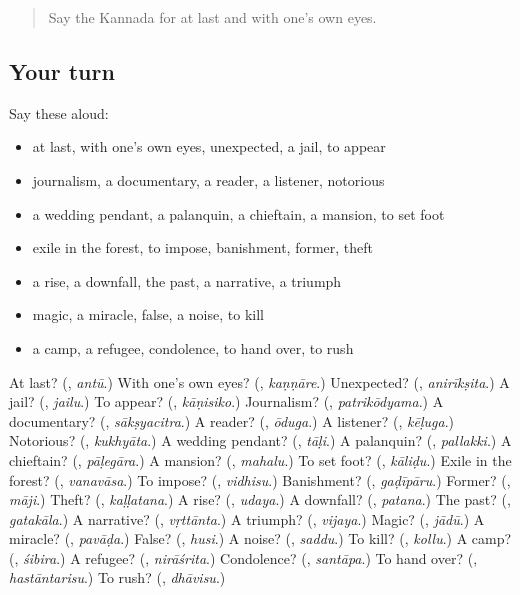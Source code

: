 \begin{quote}
Say the Kannada for at last and with one's own eyes.
\end{quote}

\subsection*{Your turn}
Say these aloud:

\begin{itemize}
\raggedright
  \item at last, with one's own eyes, unexpected, a jail, to appear
  \item journalism, a documentary, a reader, a listener, notorious
  \item a wedding pendant, a palanquin, a chieftain, a mansion, to set foot
  \item exile in the forest, to impose, banishment, former, theft
  \item a rise, a downfall, the past, a narrative, a triumph
  \item magic, a miracle, false, a noise, to kill
  \item a camp, a refugee, condolence, to hand over, to rush
\end{itemize}

\begin{tcolorbox}[breakable,colback=teal!4,colframe=teal!35!black,title={Before you move on}]
At last? (\textbf{}, \emph{antū}.) With one's own eyes? (\textbf{}, \emph{kaṇṇāre}.) Unexpected? (\textbf{}, \emph{anirīkṣita}.) A jail? (\textbf{}, \emph{jailu}.) To appear? (\textbf{}, \emph{kāṇisiko}.) Journalism? (\textbf{}, \emph{patrikōdyama}.) A documentary? (\textbf{}, \emph{sākṣyacitra}.) A reader? (\textbf{}, \emph{ōduga}.) A listener? (\textbf{}, \emph{kēḷuga}.) Notorious? (\textbf{}, \emph{kukhyāta}.) A wedding pendant? (\textbf{}, \emph{tāḷi}.) A palanquin? (\textbf{}, \emph{pallakki}.) A chieftain? (\textbf{}, \emph{pāḷegāra}.) A mansion? (\textbf{}, \emph{mahalu}.) To set foot? (\textbf{}, \emph{kāliḍu}.) Exile in the forest? (\textbf{}, \emph{vanavāsa}.) To impose? (\textbf{}, \emph{vidhisu}.) Banishment? (\textbf{}, \emph{gaḍīpāru}.) Former? (\textbf{}, \emph{māji}.) Theft? (\textbf{}, \emph{kaḷḷatana}.) A rise? (\textbf{}, \emph{udaya}.) A downfall? (\textbf{}, \emph{patana}.) The past? (\textbf{}, \emph{gatakāla}.) A narrative? (\textbf{}, \emph{vṛttānta}.) A triumph? (\textbf{}, \emph{vijaya}.) Magic? (\textbf{}, \emph{jādū}.) A miracle? (\textbf{}, \emph{pavāḍa}.) False? (\textbf{}, \emph{husi}.) A noise? (\textbf{}, \emph{saddu}.) To kill? (\textbf{}, \emph{kollu}.) A camp? (\textbf{}, \emph{śibira}.) A refugee? (\textbf{}, \emph{nirāśrita}.) Condolence? (\textbf{}, \emph{santāpa}.) To hand over? (\textbf{}, \emph{hastāntarisu}.) To rush? (\textbf{}, \emph{dhāvisu}.)
\end{tcolorbox}
